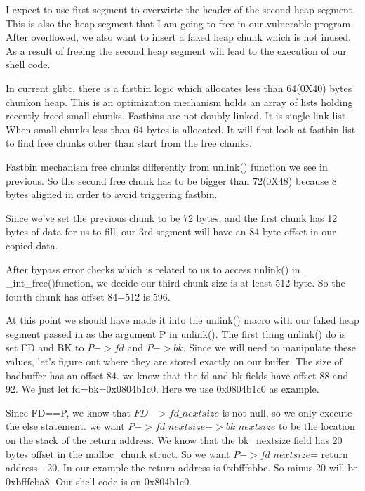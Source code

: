 \documentclass[12pt]{article}
\begin{document}
I expect to use first segment to overwirte the header of the second heap segment. This is also the heap segment that I am going to free in our vulnerable program. After overflowed, we also want to insert a faked heap chunk which is not inused. As a result of freeing the second heap segment will lead to the execution of our shell code.

In current glibc, there is a fastbin logic which allocates less than 64(0X40) bytes chunkon heap. This is an optimization mechanism holds an array of lists holding recently freed small chunks. Fastbins are not doubly linked. It is single link list. When small chunks less than 64 bytes is allocated. It will first look at fastbin list to find free chunks other than start from the free chunks. 

Fastbin mechanism free chunks differently from unlink() function we see in previous. So the second free chunk has to be bigger than 72(0X48) because 8 bytes aligned in order to avoid triggering fastbin.

Since we've set the previous chunk to be 72 bytes, and the first chunk has 12 bytes of data for us to fill, our 3rd segment will have an 84 byte offset in our copied data.

After bypass error checks which is related to us to access unlink() in \_int\_free()function, we decide our third chunk size is at least 512 byte. So the fourth chunk has offset 84+512 is 596.

At this point we should have made it into the unlink() macro with our faked heap segment passed in as the argument P in unlink(). The first thing unlink() do is set FD and BK to $P->fd$ and $P->bk$. Since we will need to manipulate these values, let's figure out where they are stored exactly on our buffer. The size of badbuffer has an offset 84. we know that the fd and bk fields have offset 88 and 92. We just let fd=bk=0x0804b1c0. Here we use 0x0804b1c0 as example.

Since FD==P, we know that $FD->fd\_nextsize$ is not null, so we only execute the else statement. we want $P->fd\_nextsize->bk\_nextsize$ to be the location on the stack of the return address. We know that the bk\_nextsize field has 20 bytes offset in the malloc\_chunk struct. So we want $P->fd\_nextsize$= return address - 20. In our example the return address is 0xbfffebbc. So minus 20 will be 0xbfffeba8. Our shell code is on 0x804b1e0.   
\end{document}
